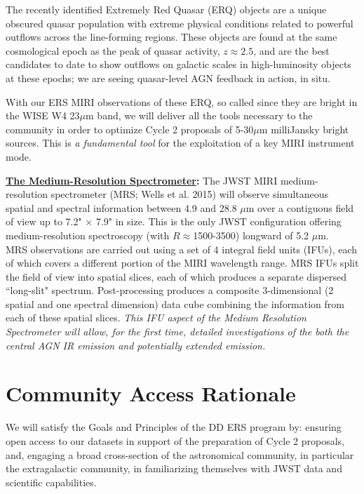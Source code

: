 \smallskip \smallskip
\noindent
The recently identified Extremely Red Quasar (ERQ) objects are a
unique obscured quasar population with extreme physical conditions
related to powerful outflows across the line-forming regions. These
objects are found at the same cosmological epoch as the peak of quasar
activity, $z\approx2.5$, and are the best candidates to date to show
outflows on galactic scales in high-luminosity objects at these epochs; 
we are seeing quasar-level AGN feedback in action, in situ.

\smallskip \smallskip
\noindent
With our ERS MIRI observations of these ERQ, so called since they are
bright in the WISE W4 23$\mu$m band, we will deliver all the tools
necessary to the community in order to optimize Cycle 2 proposals of
5-30$\mu$m milliJansky bright sources. This is {\it a fundamental
tool} for the exploitation of a key MIRI instrument mode.

\smallskip \smallskip
\noindent
{\bf \underline{The Medium-Resolution Spectrometer}:}
The JWST MIRI medium-resolution spectrometer (MRS; Wells et al. 2015)
will observe simultaneous spatial and spectral information between 4.9
and 28.8 $\mu$m over a contiguous field of view up to 7.2" × 7.9" in
size. This is the only JWST configuration offering medium-resolution
spectroscopy (with $R\approx$1500-3500) longward of 5.2 $\mu$m.\\ 
MRS observations are carried out using a set of 4 integral field units
(IFUs), each of which covers a different portion of the MIRI
wavelength range. MRS IFUs split the field of view into spatial
slices, each of which produces a separate dispersed ``long-slit"
spectrum. Post-processing produces a composite 3-dimensional (2
spatial and one spectral dimension) data cube combining the
information from each of these spatial slices. {\it This IFU aspect of
the Medium Resolution Spectrometer will allow, for the first time,
detailed investigations of the both the central AGN IR emission and
potentially extended emission.}



\section*{Community Access Rationale}
\noindent
We will satisfy the Goals and Principles of the DD ERS program by:
ensuring open access to our datasets in support of the preparation of Cycle 2 proposals, and, 
engaging a broad cross-section of the astronomical community, in particular the extragalactic community, in familiarizing themselves with JWST data and scientific capabilities.


